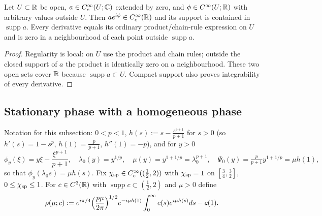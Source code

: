 \begin{lemma}
  \label{lem:c03_supported_phase_product}
  Let $U\subset\mathbb{R}$ be open, $a\in C_c^\infty(U;\mathbb{C})$ extended by zero, and
  $\phi\in C^\infty(U;\mathbb{R})$ with arbitrary values outside $U$.
  Then $a e^{i\phi}\in C_c^\infty(\mathbb{R})$ and its support is contained in $\operatorname{supp}a$.
  Every derivative equals its ordinary product/chain-rule expression on $U$ and is zero
  in a neighbourhood of each point outside $\operatorname{supp}a$.
\end{lemma}
\begin{proof}
  Regularity is local: on $U$ use the product and chain rules; outside the closed support of $a$
  the product is identically zero on a neighbourhood. These two open sets cover $\mathbb{R}$ because
  $\operatorname{supp}a\subset U$. Compact support also proves integrability of every derivative.
\end{proof}

\subsection{Stationary phase with a homogeneous phase}

Notation for this subsection: $0<p<1$, $h(s):=s-\frac{s^{p+1}}{p+1}$ for $s>0$ (so $h'(s)=1-s^p$, $h(1)=\frac p{p+1}$, $h''(1)=-p$), and for $y>0$
\[
  \phi_y(\xi)=y\xi-\frac{\xi^{p+1}}{p+1},\quad \lambda_0(y)=y^{1/p},\quad \mu(y)=y^{1+1/p}=\lambda_0^{p+1},\quad \Psi_0(y)=\tfrac p{p+1}y^{1+1/p}=\mu h(1),
\]
so that $\phi_y(\lambda_0s)=\mu h(s)$. Fix $\chi_{\textup{sp}}\in C_c^\infty((\frac12,2))$ with $\chi_{\textup{sp}}=1$ on $[\frac34,\frac32]$, $0\le\chi_{\textup{sp}}\le1$.
For $c\in C^3(\mathbb{R})$ with $\operatorname{supp}c\subset(\frac12,2)$ and $\mu>0$ define
\[
  \rho(\mu;c):=e^{i\pi/4}\Bigl(\frac{p\mu}{2\pi}\Bigr)^{1/2}e^{-i\mu h(1)}\int_0^\infty c(s)e^{i\mu h(s)}ds-c(1).
\]

